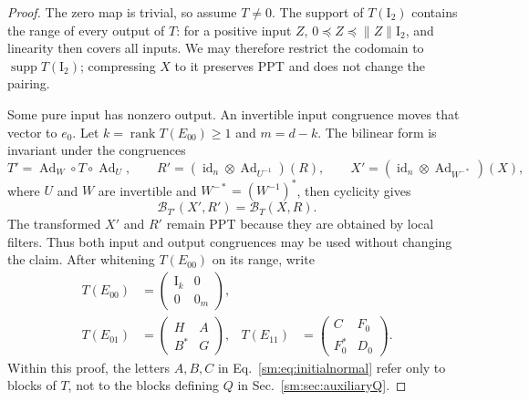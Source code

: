 \documentclass[aps,prl,reprint,superscriptaddress,nofootinbib]{revtex4-2}
\newcommand{\I}{\mathrm{I}}
\newcommand{\id}{\operatorname{id}}
\newcommand{\Ad}{\operatorname{Ad}}
\newcommand{\supp}{\operatorname{supp}}
\newcommand{\cB}{\mathcal B}
\begin{document}
\begin{proof}
The zero map is trivial, so assume \(T\neq0\).  The support of
\(T(\I_2)\) contains the range of every output of \(T\): for a positive
input \(Z\), \(0\preceq Z\preceq\|Z\|\I_2\), and linearity then covers
all inputs.  We may therefore restrict the codomain to
$\supp T(\I_2)$;
compressing \(X\) to it preserves PPT and does not change the pairing.

Some pure input has nonzero output.  An invertible input congruence moves
that vector to \(e_0\).  Let \(k=\operatorname{rank}T(E_{00})\geq1\)
and \(m=d-k\).  The bilinear form is invariant under the congruences
\begin{equation}
 T'=\Ad_W\circ T\circ\Ad_U,\qquad
 R'=(\id_n\otimes\Ad_{U^{-1}})(R),\qquad
 X'=(\id_n\otimes\Ad_{W^{-*}})(X),
\label{sm:eq:bilinearcovariance}
\end{equation}
where \(U\) and \(W\) are invertible and
\(W^{-*}=(W^{-1})^*\), then cyclicity gives
\begin{equation}
 \cB_{T'}(X',R')=\cB_T(X,R).
\label{sm:eq:bilinearcovariancepairing}
\end{equation}
The transformed \(X'\) and \(R'\) remain PPT because they are obtained by
local filters.  Thus both input and output congruences may be used without
changing the claim.
After whitening \(T(E_{00})\) on its range, write
\begin{align}
 T(E_{00})&=\begin{pmatrix}\I_k&0\\0&0_m\end{pmatrix},
\nonumber\\
 T(E_{01})&=\begin{pmatrix}H&A\\B^*&G\end{pmatrix},&
 T(E_{11})&=\begin{pmatrix}C&F_0\\F_0^*&D_0\end{pmatrix}.
\label{sm:eq:initialnormal}
\end{align}
Within this proof, the letters \(A,B,C\) in Eq.~\eqref{sm:eq:initialnormal}
refer only to blocks of \(T\), not to the blocks defining \(Q\) in
Sec.~\ref{sm:sec:auxiliaryQ}.


\end{proof}
\end{document}
